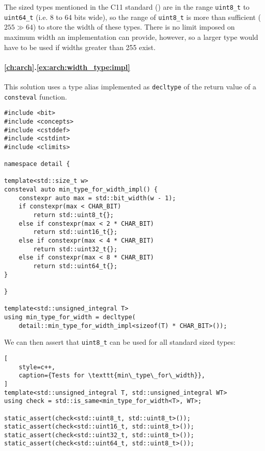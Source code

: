 
The sized types mentioned in the C11 standard (\cite{C2011}) are in the range
\texttt{uint8\_t} to \texttt{uint64\_t} (i.e. 8 to 64 bits wide), so the range
of \texttt{uint8\_t} is more than sufficient ($255 \gg 64$) to store the width
of these types.  There is no limit imposed on maximum width an implementation
can provide, however, so a larger type would have to be used if widths greater
than 255 exist.

\paragraph{\ref{ch:arch}.\ref{ex:arch:width_type:impl}}

This solution uses a type alias implemented as \texttt{decltype} of the return
value of a \texttt{consteval} function.

\begin{lstlisting}[style=c++,caption={\texttt{min\_type\_for\_width}}]
#include <bit>
#include <concepts>
#include <cstddef>
#include <cstdint>
#include <climits>

namespace detail {

template<std::size_t w>
consteval auto min_type_for_width_impl() {
    constexpr auto max = std::bit_width(w - 1);
    if constexpr(max < CHAR_BIT)
        return std::uint8_t{};
    else if constexpr(max < 2 * CHAR_BIT)
        return std::uint16_t{};
    else if constexpr(max < 4 * CHAR_BIT)
        return std::uint32_t{};
    else if constexpr(max < 8 * CHAR_BIT)
        return std::uint64_t{};
}

}

template<std::unsigned_integral T>
using min_type_for_width = decltype(
    detail::min_type_for_width_impl<sizeof(T) * CHAR_BIT>());
\end{lstlisting}

We can then assert that \texttt{uint8\_t} can be used for all standard sized
types:

\begin{lstlisting}[
    style=c++,
    caption={Tests for \texttt{min\_type\_for\_width}},
]
template<std::unsigned_integral T, std::unsigned_integral WT>
using check = std::is_same<min_type_for_width<T>, WT>;

static_assert(check<std::uint8_t, std::uint8_t>());
static_assert(check<std::uint16_t, std::uint8_t>());
static_assert(check<std::uint32_t, std::uint8_t>());
static_assert(check<std::uint64_t, std::uint8_t>());
\end{lstlisting}

